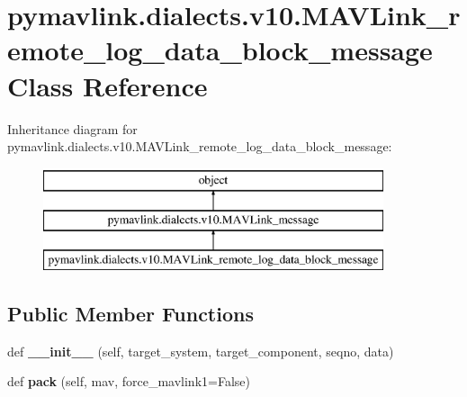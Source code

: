 \hypertarget{classpymavlink_1_1dialects_1_1v10_1_1MAVLink__remote__log__data__block__message}{}\section{pymavlink.\+dialects.\+v10.\+M\+A\+V\+Link\+\_\+remote\+\_\+log\+\_\+data\+\_\+block\+\_\+message Class Reference}
\label{classpymavlink_1_1dialects_1_1v10_1_1MAVLink__remote__log__data__block__message}
Inheritance diagram for pymavlink.\+dialects.\+v10.\+M\+A\+V\+Link\+\_\+remote\+\_\+log\+\_\+data\+\_\+block\+\_\+message\+:\begin{figure}[H]
\begin{center}
\leavevmode
\includegraphics[height=3.000000cm]{classpymavlink_1_1dialects_1_1v10_1_1MAVLink__remote__log__data__block__message}
\end{center}
\end{figure}
\subsection*{Public Member Functions}
\begin{DoxyCompactItemize}
\item 
\mbox{\label{classpymavlink_1_1dialects_1_1v10_1_1MAVLink__remote__log__data__block__message_ad7cb0eb7e3216e8a9634a1d0483ba583}} 
def {\bfseries \+\_\+\+\_\+init\+\_\+\+\_\+} (self, target\+\_\+system, target\+\_\+component, seqno, data)
\item 
\mbox{\label{classpymavlink_1_1dialects_1_1v10_1_1MAVLink__remote__log__data__block__message_af7ff6b1c8ed97b7a0e76338a6458fa62}} 
def {\bfseries pack} (self, mav, force\+\_\+mavlink1=False)
\end{DoxyCompactItemize}
